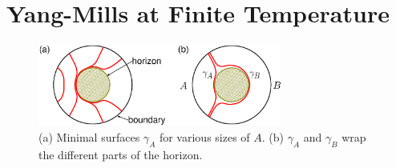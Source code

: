\documentclass[twocolumn,amsmath,amssymb,nofootinbib,eqsecnum,tighten,prd]{revtex4}
\begin{document}
\section{Yang-Mills at Finite Temperature}


\begin{figure}
\begin{center}
\includegraphics[width=8cm,clip]{ads_blackhole.eps}
\end{center}
\caption{ \label{fig: ads_blackhole.eps} (a) Minimal surfaces
$\gamma_A$ for various sizes of $A$. (b) $\gamma_A$ and $\gamma_B$
wrap the different parts of the horizon.}
\end{figure}
\end{document}
